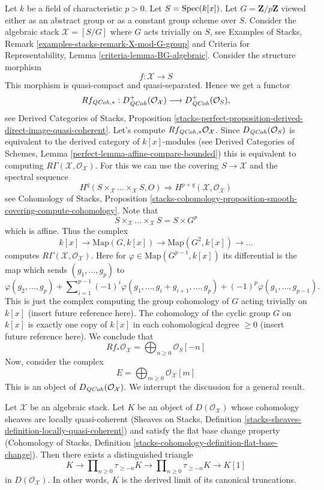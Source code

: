 \noindent
Let $k$ be a field of characteristic $p > 0$. Let $S = \mathop{\mathrm{Spec}}(k[x])$.
Let $G = \mathbf{Z}/p\mathbf{Z}$ viewed either as an abstract group
or as a constant group scheme over $S$. Consider the algebraic stack
$\mathcal{X} = [S/G]$ where $G$ acts trivially on $S$, see
Examples of Stacks, Remark \ref{examples-stacks-remark-X-mod-G-group}
and
Criteria for Representability, Lemma \ref{criteria-lemma-BG-algebraic}.
Consider the structure morphism
$$
f : \mathcal{X} \longrightarrow S
$$
This morphism is quasi-compact and quasi-separated. Hence we get a functor
$$
Rf_{\mathit{QCoh}, *} :
D^{+}_{\mathit{QCoh}}(\mathcal{O}_\mathcal{X})
\longrightarrow
D^{+}_{\mathit{QCoh}}(\mathcal{O}_S),
$$
see 
Derived Categories of Stacks, Proposition
\ref{stacks-perfect-proposition-derived-direct-image-quasi-coherent}.
Let's compute $Rf_{\mathit{QCoh}, *}\mathcal{O}_\mathcal{X}$.
Since $D_{\mathit{QCoh}}(\mathcal{O}_S)$ is equivalent to
the derived category of $k[x]$-modules (see
Derived Categories of Schemes, Lemma
\ref{perfect-lemma-affine-compare-bounded})
this is equivalent to computing
$R\Gamma(\mathcal{X}, \mathcal{O}_\mathcal{X})$.
For this we can use the covering $S \to \mathcal{X}$ and the spectral
sequence
$$
H^q(S \times_\mathcal{X} \ldots \times_\mathcal{X} S, O)
\Rightarrow H^{p + q}(\mathcal{X}, \mathcal{O}_\mathcal{X})
$$
see
Cohomology of Stacks, Proposition
\ref{stacks-cohomology-proposition-smooth-covering-compute-cohomology}.
Note that
$$
S \times_\mathcal{X} \ldots \times_\mathcal{X} S = S \times G^p
$$
which is affine. Thus the complex
$$
k[x] \to \text{Map}(G, k[x]) \to \text{Map}(G^2, k[x]) \to \ldots
$$
computes $R\Gamma(\mathcal{X}, \mathcal{O}_\mathcal{X})$.
Here for $\varphi \in \text{Map}(G^{p - 1}, k[x])$ its differential is
the map which sends $(g_1, \ldots, g_p)$ to
$$
\varphi(g_2, \ldots, g_p) +
\sum\nolimits_{i = 1}^{p - 1}
(-1)^i\varphi(g_1, \ldots, g_i + g_{i + 1}, \ldots, g_p)
+ (-1)^p\varphi(g_1, \ldots, g_{p - 1}).
$$
This is just the complex computing the group cohomology of $G$ acting
trivially on $k[x]$ (insert future reference here). The cohomology of
the cyclic group $G$ on $k[x]$ is exactly one copy of $k[x]$ in each
cohomological degree $\geq 0$ (insert future reference here). We conclude
that
$$
Rf_*\mathcal{O}_\mathcal{X} = \bigoplus\nolimits_{n \geq 0} \mathcal{O}_S[-n]
$$
Now, consider the complex
$$
E = \bigoplus\nolimits_{m \geq 0} \mathcal{O}_\mathcal{X}[m]
$$
This is an object of $D_{\mathit{QCoh}}(\mathcal{O}_\mathcal{X})$. We interrupt the
discussion for a general result.

\begin{lemma}
\label{lemma-is-limit}
Let $\mathcal{X}$ be an algebraic stack. Let $K$ be an object of
$D(\mathcal{O}_\mathcal{X})$ whose cohomology sheaves are locally
quasi-coherent (Sheaves on Stacks, Definition
\ref{stacks-sheaves-definition-locally-quasi-coherent})
and satisfy the flat base change property (Cohomology of Stacks,
Definition \ref{stacks-cohomology-definition-flat-base-change}).
Then there exists a distinguished triangle
$$
K \to
\prod\nolimits_{n \geq 0} \tau_{\geq -n} K \to
\prod\nolimits_{n \geq 0} \tau_{\geq -n} K \to K[1]
$$
in $D(\mathcal{O}_\mathcal{X})$. In other words, $K$ is the derived
limit of its canonical truncations.
\end{lemma}

